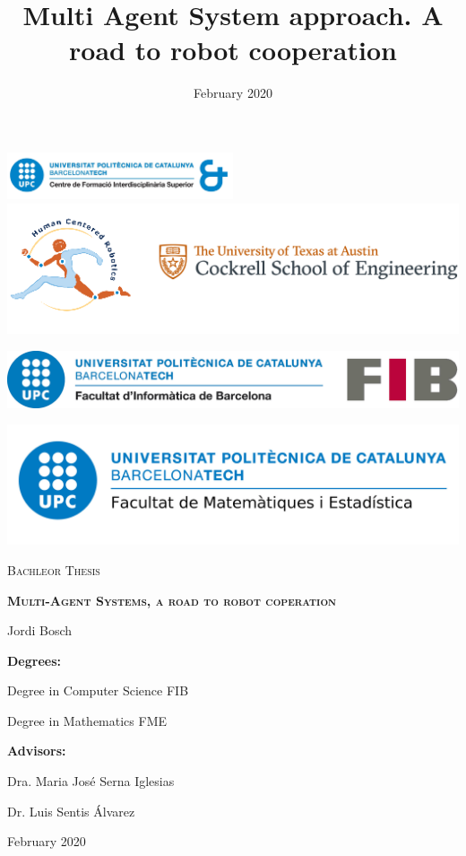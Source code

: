 \documentclass{article}
\title{Multi Agent System approach. A road to robot cooperation}
\author{}
\date{February 2020}
\begin{document}
\begin{titlepage}
	
	\hspace{0.071cm}\includegraphics[width=0.5\textwidth]{img/logo_CFIS.jpg}\hspace{0.2cm}
	\includegraphics[scale=0.25]{img/hcrl.png}	
	\par\vspace{0.4cm}
	\hspace{0.13cm}\includegraphics[scale=0.061125]{img/logo_FIB.jpg}\par \vspace{0.3cm}
	\includegraphics[scale=0.25]{img/logo_FME.jpg}\par\vspace{1cm}
	\centering
	\vspace{1cm}
	{\scshape\LARGE Bachleor Thesis \par}
	\vspace{2cm}
	{\scshape\LARGE \textbf{Multi-Agent Systems, a road to robot coperation} \par}
	\vspace{1.5cm}
	{\Large Jordi Bosch \par}
	\vspace{1cm}
	\begin{flushleft}
	{\textbf{Degrees:}\par}
	{Degree in Computer Science FIB \par}
	{Degree in Mathematics FME \par }
	
	{\textbf{Advisors:}\par \par }
	{Dra. Maria José Serna Iglesias \par}
	{Dr. Luis Sentis Álvarez}
	\end{flushleft}
	\vfill

	{\large February 2020}
\end{titlepage}
\end{document}
